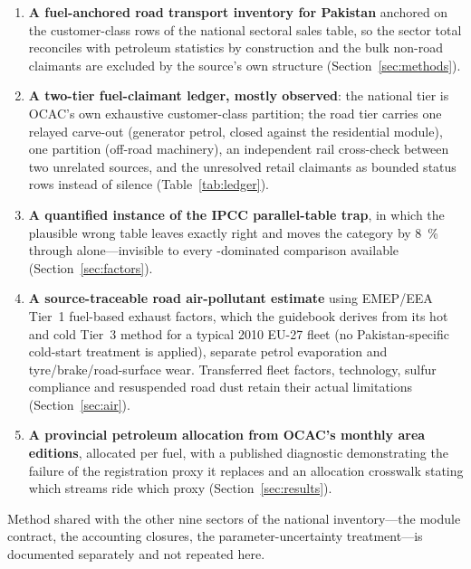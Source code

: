 \begin{enumerate}[leftmargin=*,itemsep=2pt,topsep=3pt]
\item \textbf{A fuel-anchored road transport inventory for Pakistan} anchored on the
  customer-class rows of the national sectoral sales table, so the sector total
  reconciles with petroleum statistics by construction and the bulk non-road claimants
  are excluded by the source's own structure (Section~\ref{sec:methods}).
\item \textbf{A two-tier fuel-claimant ledger, mostly observed}: the national tier is
  OCAC's own exhaustive customer-class partition; the road tier carries one relayed
  carve-out (generator petrol, closed against the residential module), one partition
  (off-road machinery), an independent rail cross-check between two unrelated sources,
  and the unresolved retail claimants as bounded status rows instead of silence
  (Table~\ref{tab:ledger}).
\item \textbf{A quantified instance of the IPCC parallel-table trap}, in which the plausible
  wrong table leaves \COtwo{} exactly right and moves the category by \SI{8}{\percent} through
  \NtwoO{} alone---invisible to every \COtwo{}-dominated comparison available
  (Section~\ref{sec:factors}).
\item \textbf{A source-traceable road air-pollutant estimate} using EMEP/EEA Tier~1 fuel-based exhaust factors, which the guidebook derives from its hot and cold Tier~3 method for a typical 2010 EU-27 fleet (no Pakistan-specific cold-start treatment is applied), separate petrol evaporation and tyre/brake/road-surface wear. Transferred fleet factors, technology, sulfur compliance and resuspended road dust retain their actual limitations (Section~\ref{sec:air}).
\item \textbf{A provincial petroleum allocation from OCAC's monthly area editions},
  allocated per fuel, with a published diagnostic demonstrating the failure of the
  registration proxy it replaces and an allocation crosswalk stating which streams ride
  which proxy (Section~\ref{sec:results}).
\end{enumerate}

Method shared with the other nine sectors of the national inventory---the module contract,
the accounting closures, the parameter-uncertainty treatment---is documented separately
\citep{ahmad2026national} and not repeated here.
